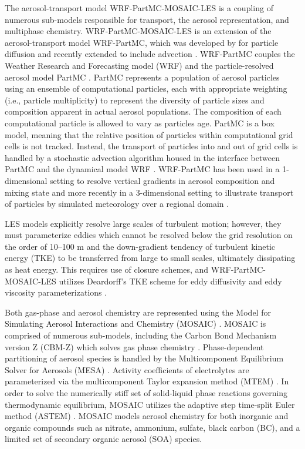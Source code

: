 \documentclass[journal abbreviation, manuscript]{copernicus}
\begin{document}
The aerosol-transport model WRF-PartMC-MOSAIC-LES is a coupling of numerous sub-models responsible for transport, the aerosol representation, and multiphase chemistry. WRF-PartMC-MOSAIC-LES is an extension of the aerosol-transport model WRF-PartMC, which was developed by \citet{curtis_single-column_2017} for particle diffusion and recently extended to include advection \citep{gmd-17-8399-2024}. WRF-PartMC couples the Weather Research and Forecasting model (WRF) \citep{skamarock_description_2008} and the particle-resolved aerosol model PartMC \citep{riemer_simulating_2009}. PartMC represents a population of aerosol particles using an ensemble of computational particles, each with appropriate weighting (i.e., particle multiplicity) to represent the diversity of particle sizes and composition apparent in actual aerosol populations. The composition of each computational particle is allowed to vary as particles age. PartMC is a box model, meaning that the relative position of particles within computational grid cells is not tracked. Instead, the transport of particles into and out of grid cells is handled by a stochastic advection algorithm housed in the interface between PartMC and the dynamical model WRF \citep{gmd-17-8399-2024}. WRF-PartMC has been used in a 1-dimensional setting to resolve vertical gradients in aerosol composition and mixing state \citep {curtis_single-column_2017} and more recently in a 3-dimensional setting to illustrate transport of particles by simulated meteorology over a regional domain \citep{gmd-17-8399-2024}.


LES models explicitly resolve large scales of turbulent motion; however, they must parameterize eddies which cannot be resolved below the grid resolution on the order of 10--100 m and the down-gradient tendency of turbulent kinetic energy (TKE) to be transferred from large to small scales, ultimately dissipating as heat energy. This requires use of closure schemes, and WRF-PartMC-MOSAIC-LES utilizes Deardorff's TKE scheme for eddy diffusivity and eddy viscosity parameterizations \citep{deardorff_stratocumulus-capped_1980}.

Both gas-phase and aerosol chemistry are represented using the Model for Simulating Aerosol Interactions and Chemistry (MOSAIC) \citep{zaveri_model_2008}. MOSAIC is comprised of numerous sub-models, including the Carbon Bond Mechanism version Z (CBM-Z) which solves gas phase chemistry \citep{zaveri_new_1999}. Phase-dependent partitioning of aerosol species is handled by the Multicomponent Equilibrium Solver for Aerosols (MESA) \citep{zaveri_computationally_2005}. Activity coefficients of electrolytes are parameterized via the multicomponent Taylor expansion method (MTEM) \citep{zaveri_new_2005}. In order to solve the numerically stiff set of solid-liquid phase reactions governing thermodynamic equilibrium, MOSAIC utilizes the adaptive step time-split Euler method (ASTEM) \citep{zaveri_model_2008}. MOSAIC models aerosol chemistry for both inorganic and organic compounds such as nitrate, ammonium, sulfate, black carbon (BC), and a limited set of secondary organic aerosol (SOA) species. 
\end{document}
